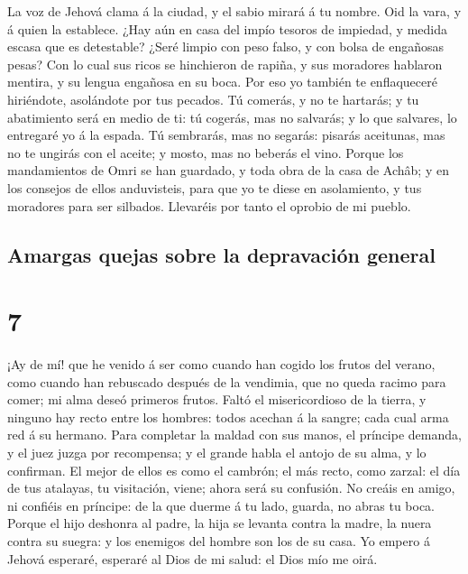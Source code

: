  La voz de Jehová clama á la ciudad, y el sabio mirará á
tu nombre. Oid la vara, y á quien la establece.  ¿Hay aún
en casa del impío tesoros de impiedad, y medida escasa que es
detestable?  ¿Seré limpio con peso falso, y con bolsa de
engañosas pesas?  Con lo cual sus ricos se hinchieron de
rapiña, y sus moradores hablaron mentira, y su lengua engañosa en su
boca.  Por eso yo también te enflaqueceré hiriéndote,
asolándote por tus pecados.  Tú comerás, y no te
hartarás; y tu abatimiento será en medio de ti: tú cogerás, mas no
salvarás; y lo que salvares, lo entregaré yo á la espada.
 Tú sembrarás, mas no segarás: pisarás aceitunas, mas no
te ungirás con el aceite; y mosto, mas no beberás el vino.
 Porque los mandamientos de Omri se han guardado, y toda
obra de la casa de Achâb; y en los consejos de ellos anduvisteis, para
que yo te diese en asolamiento, y tus moradores para ser silbados.
Llevaréis por tanto el oprobio de mi pueblo.

\hypertarget{amargas-quejas-sobre-la-depravaciuxf3n-general}{%
\subsection{Amargas quejas sobre la depravación
general}\label{amargas-quejas-sobre-la-depravaciuxf3n-general}}

\hypertarget{section-6}{%
\section{7}\label{section-6}}

 ¡Ay de mí! que he venido á ser como cuando han cogido los
frutos del verano, como cuando han rebuscado después de la vendimia, que
no queda racimo para comer; mi alma deseó primeros frutos.
 Faltó el misericordioso de la tierra, y ninguno hay recto
entre los hombres: todos acechan á la sangre; cada cual arma red á su
hermano.  Para completar la maldad con sus manos, el
príncipe demanda, y el juez juzga por recompensa; y el grande habla el
antojo de su alma, y lo confirman.  El mejor de ellos es
como el cambrón; el más recto, como zarzal: el día de tus atalayas, tu
visitación, viene; ahora será su confusión.  No creáis en
amigo, ni confiéis en príncipe: de la que duerme á tu lado, guarda, no
abras tu boca.  Porque el hijo deshonra al padre, la hija
se levanta contra la madre, la nuera contra su suegra: y los enemigos
del hombre son los de su casa.  Yo empero á Jehová
esperaré, esperaré al Dios de mi salud: el Dios mío me oirá.

